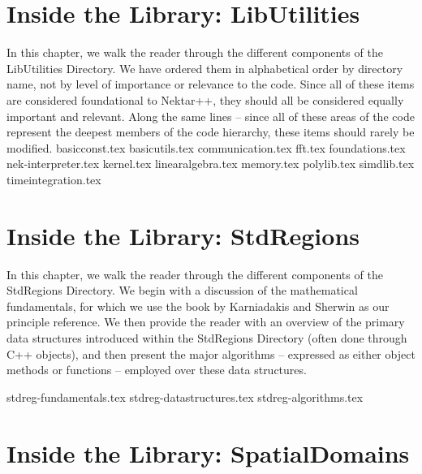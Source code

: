 
\chapter{Inside the Library: LibUtilities}

In this chapter, we walk the reader through the different components of the LibUtilities Directory.
We have ordered them in alphabetical order by directory name, not by level of importance or
relevance to the code.  Since all of these items are considered foundational to Nektar++, they
should all be considered equally important and relevant.   Along the same lines -- since all of
these areas of the code represent the deepest members of the code hierarchy, these
items should rarely be modified.
%
{basicconst.tex}
%
{basicutils.tex}
%
{communication.tex}
%
{fft.tex}
%
{foundations.tex}
%
{nek-interpreter.tex}
%
{kernel.tex}
%
{linearalgebra.tex}
%
{memory.tex}
%
{polylib.tex}
%
{simdlib.tex}
%
{timeintegration.tex}

\chapter{Inside the Library: StdRegions}
\label{chap:stdregions}

In this chapter, we walk the reader through the different components of the StdRegions Directory.
We begin with a discussion of the mathematical fundamentals, for which we use the book
by Karniadakis and Sherwin \cite{KaSh05} as our principle reference.  We then provide
the reader with an overview of the primary data structures introduced within the
StdRegions Directory (often done through C++ objects), and then present the major
algorithms -- expressed as either object methods or functions -- employed over these data structures.

{stdreg-fundamentals.tex}
%
{stdreg-datastructures.tex}
%
{stdreg-algorithms.tex}


\chapter{Inside the Library: SpatialDomains}
\label{chap:spatialdomains}


